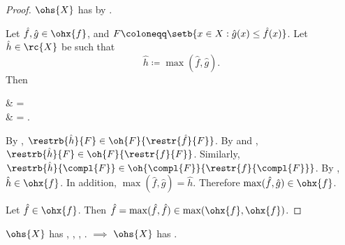 \documentclass[b5paper, english, oneside]{memoir}
\begin{document}
\begin{proof}
$\ohs{X}$ has  by . 

\proofpart{$\subset$} 
Let $\hat{f}, \hat{g} \in \ohx{f}$, and $F \coloneqq \setb{x \in X: \hat{g}(x) \leq \hat{f}(x)}$. Let $\hat{h} \in \rc{X}$ be such that
\begin{equation}
\hat{h} \coloneqq \max(\hat{f}, \hat{g}).
\end{equation}
Then
\begin{eqs}
 & =  \\
{} & = .
\end{eqs}
By , $\restrb{\hat{h}}{F} \in \oh{F}{\restr{\hat{f}}{F}}$. By  and , $\restrb{\hat{h}}{F} \in \oh{F}{\restr{f}{F}}$. Similarly, $\restrb{\hat{h}}{\compl{F}} \in \oh{\compl{F}}{\restr{f}{\compl{F}}}$. By , $\hat{h} \in \ohx{f}$. In addition, $\max(\hat{f}, \hat{g}) = \hat{h}$. Therefore $\max(\hat{f}, \hat{g}) \in \ohx{f}$.

\proofpart{$\supset$}
Let $\hat{f} \in \ohx{f}$. Then $\hat{f} = \max(\hat{f}, \hat{f}) \in \max(\ohx{f}, \ohx{f})$.

\end{proof}

\begin{theorem}
\label{MultiplicativeConsistencyIsImplied}
$\ohs{X}$ has , , , . $\implies$ $\ohs{X}$ has .
\end{theorem}
\end{document}
